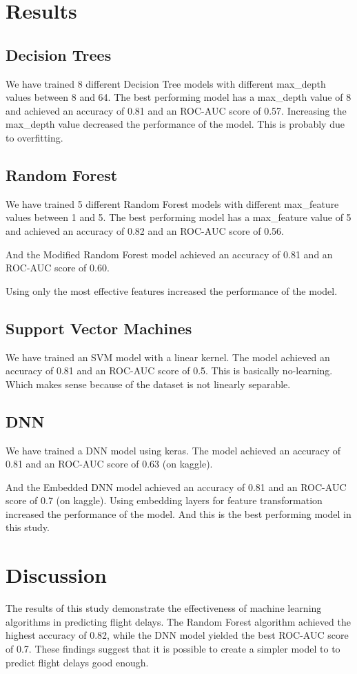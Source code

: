 \documentclass[conference]{IEEEtran}
\begin{document}
\section{Results}

\subsection{Decision Trees}
We have trained 8 different Decision Tree models with different max\_depth values between 8 and 64. The best performing model has a max\_depth value of 8 and achieved an accuracy of 0.81 and an ROC-AUC score of 0.57. Increasing the max\_depth value decreased the performance of the model. This is probably due to overfitting.

\subsection{Random Forest}
We have trained 5 different Random Forest models with different max\_feature values between 1 and 5. The best performing model has a max\_feature value of 5 and achieved an accuracy of 0.82 and an ROC-AUC score of 0.56.

And the Modified Random Forest model achieved an accuracy of 0.81 and an ROC-AUC score of 0.60.

Using only the most effective features increased the performance of the model.

\subsection{Support Vector Machines}
We have trained an SVM model with a linear kernel. The model achieved an accuracy of 0.81 and an ROC-AUC score of 0.5. This is basically no-learning. Which makes sense because of the dataset is not linearly separable.

\subsection{DNN}
We have trained a DNN model using keras. The model achieved an accuracy of 0.81 and an ROC-AUC score of 0.63 (on kaggle). 

And the Embedded DNN model achieved an accuracy of 0.81 and an ROC-AUC score of 0.7 (on kaggle). Using embedding layers for feature transformation increased the performance of the model. And this is the best performing model in this study.

\section{Discussion}
The results of this study demonstrate the effectiveness of machine learning algorithms in predicting flight delays. The Random Forest algorithm achieved the highest accuracy of 0.82, while the DNN model yielded the best ROC-AUC score of 0.7. These findings suggest that it is possible to create a simpler model to to predict flight delays good enough.
\end{document}
